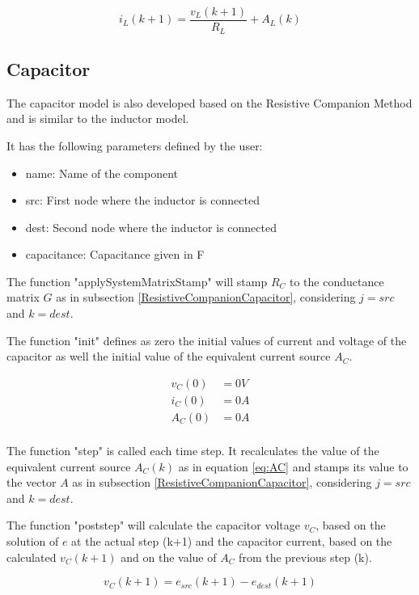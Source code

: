 \begin{equation} \label{eq:inductorCurrent}
i_L(k+1) = \frac{v_L(k+1)}{R_L} + A_L(k)
\end{equation}
 

\subsection{Capacitor}

The capacitor model is also developed based on the Resistive Companion Method and is similar to the inductor model.

It has the following parameters defined by the user:

\begin{itemize}
\item name: Name of the component
\item src: First node where the inductor is connected
\item dest: Second node where the inductor is connected
\item capacitance: Capacitance given in F
\end{itemize}

The function "applySystemMatrixStamp" will stamp $R_C$ to the conductance matrix $G$ as in subsection \ref{ResistiveCompanionCapacitor}, considering $j=src$ and $k=dest$.

The function "init" defines as zero the initial values of current and voltage of the capacitor as well the initial value of the equivalent current source $A_C$.

\begin{align*}
v_C(0)&=0V \\
i_C(0)&=0A \\
A_C(0)&=0A \\
\end{align*}

The function "step" is called each time step. It recalculates the value of the equivalent current source $A_C(k)$ as in equation \ref{eq:AC} and stamps its value to the vector $A$ as in subsection \ref{ResistiveCompanionCapacitor}, considering $j=src$ and $k=dest$.

The function "poststep" will calculate the capacitor voltage $v_C$, based on the solution of $e$ at the actual step (k+1) and the capacitor current, based on the calculated $v_C(k+1)$ and on the value of $A_C$ from the previous step (k).

\begin{equation}
v_C(k+1) = e_{src}(k+1) - e_{dest}(k+1)
\end{equation}

